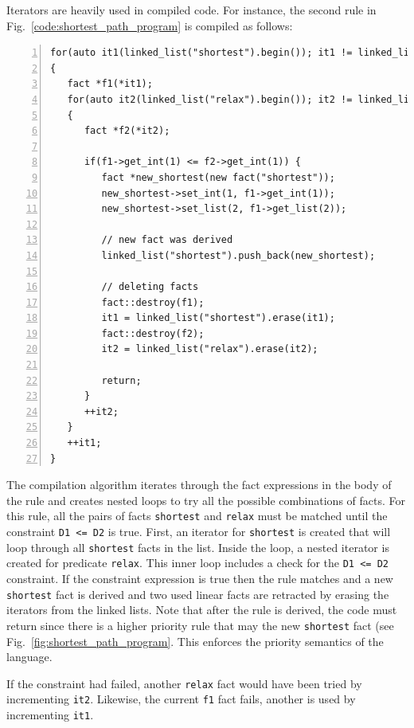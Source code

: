 Iterators are heavily used in compiled code. For instance, the second rule in
Fig.~\ref{code:shortest_path_program} is compiled as follows:

\begin{Verbatim}[numbers=left,fontsize=\scriptsize]
for(auto it1(linked_list("shortest").begin()); it1 != linked_list("shortest").end(); )
{
   fact *f1(*it1);
   for(auto it2(linked_list("relax").begin()); it2 != linked_list("relax").end(); )
   {
      fact *f2(*it2);

      if(f1->get_int(1) <= f2->get_int(1)) {
         fact *new_shortest(new fact("shortest"));
         new_shortest->set_int(1, f1->get_int(1));
         new_shortest->set_list(2, f1->get_list(2));

         // new fact was derived
         linked_list("shortest").push_back(new_shortest);

         // deleting facts
         fact::destroy(f1);
         it1 = linked_list("shortest").erase(it1);
         fact::destroy(f2);
         it2 = linked_list("relax").erase(it2);

         return;
      }
      ++it2;
   }
   ++it1;
}
\end{Verbatim}


The compilation algorithm iterates through the fact expressions in the body of
the rule and creates nested loops to try all the possible combinations of facts. For
this rule, all the pairs of facts \texttt{shortest} and
\texttt{relax} must be matched until the constraint \texttt{D1 <= D2} is
true. First, an iterator for \texttt{shortest} is created
that will loop through all \texttt{shortest} facts in the list. Inside the loop,
a nested iterator is created for predicate \texttt{relax}. This inner loop
includes a check for the \texttt{D1 <= D2} constraint. If the constraint expression is true then the rule
matches and a new \texttt{shortest} fact is derived and two used linear facts
are retracted by erasing the iterators from the linked lists. Note that after
the rule is derived, the code must return since there is a higher priority rule
that may the new \texttt{shortest} fact (see
Fig.~\ref{fig:shortest_path_program}. This enforces the priority semantics of
the language.
    
If the constraint had failed, another \texttt{relax} fact
would have been tried by incrementing \texttt{it2}. Likewise, the current
\texttt{f1} fact fails, another is used by incrementing \texttt{it1}.

